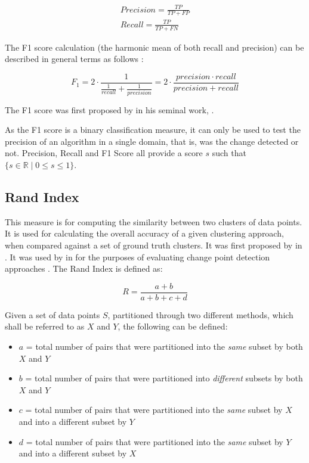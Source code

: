 \documentclass[../main.tex]{subfiles}
\begin{document}
	\begin{eqnarray}
	    Precision = \frac{TP}{TP + FP}\\
	    Recall = \frac{TP}{TP + FN}
	\end{eqnarray}
		
	The F1 score calculation (the harmonic mean of both recall and precision) can be described in general terms as follows \cite{VanRijsbergen1979}:

	\begin{equation}
		F_1 = 2 \cdot \frac{1}{\frac{1}{recall} + \frac{1}{precision}} = 2 \cdot \frac{precision \cdot recall}{precision+recall}
		\label{equ:F1}
	\end{equation}

    The F1 score was first proposed by \citeauthor{VanRijsbergen1979} in his seminal work, .

	As the F1 score is a binary classification measure, it can only be used to test the precision of an algorithm in a single domain, that is, was the change detected or not. Precision, Recall and F1 Score all provide a score $s$ such that $ \{s\in\mathbb{R} \mid 0\leq s \leq 1\} $.

\subsection{Rand Index}

This measure is for computing the similarity between two clusters of data points. It is used for calculating the overall accuracy of a given clustering approach, when compared against a set of ground truth clusters. It was first proposed by \citeauthor{Rand1971} in  \cite{Rand1971}. It was used by \citeauthor{Matteson2012} in  for the purposes of evaluating change point detection approaches \cite{Matteson2012}. The Rand Index is defined as:

	\begin{equation}
		R = \frac{a+b}{a+b+c+d}
	\end{equation}
	
	Given a set of data points $S$, partitioned through two different methods, which shall be referred to as $X$ and $Y$, the following can be defined:
	
	\begin{itemize}
		\item $a$ = total number of pairs that were partitioned into the \emph{same} subset by both $X$ and $Y$
		\item $b$ = total number of pairs that were partitioned into \emph{different} subsets by both $X$ and $Y$
		\item $c$ = total number of pairs that were partitioned into the \emph{same} subset by $X$ and into a different subset by $Y$
		\item $d$ = total number of pairs that were partitioned into the \emph{same} subset by $Y$ and into a different subset by $X$
	\end{itemize}
	
\end{document}

